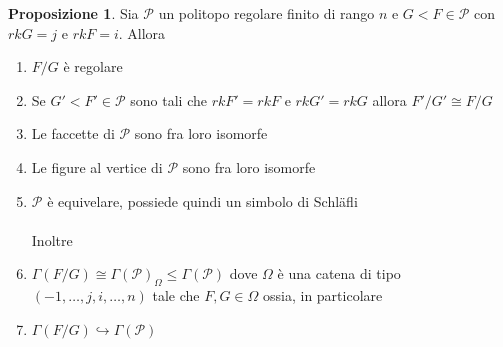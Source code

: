 \documentclass[a4paper,12pt]{report}
\newcommand{\p}{\mathcal{P}}
\theoremstyle{plain}
\theoremstyle{definition}
\newtheorem{prop}[teo]{Proposizione}
\newcommand\locallabel[1]{\label{\currentprefix_#1}}
\begin{document}
\def\currentprefix{prop:RegularSections}
\begin{prop}
\label{prop:RegularSections}
Sia $\p$ un politopo regolare finito di rango $n$ e $G<F\in\p$ con $rkG=j$ e $rkF=i$. Allora
\begin{enumerate}
\item\locallabel{1} $F/G$ \`e regolare
\item\locallabel{2} Se $G'<F'\in\p$ sono tali che $rkF'=rkF$ e $rkG'=rkG$ allora $F'/G'\cong F/G$
\item\locallabel{3} Le faccette di $\p$ sono fra loro isomorfe
\item\locallabel{4} Le figure al vertice di $\p$ sono fra loro isomorfe
\item\locallabel{5} $\p$ \`e equivelare, possiede quindi un simbolo di Schl\"afli\\\\
Inoltre
\item\locallabel{6} $\Gamma(F/G)\cong \Gamma(\p)_\Omega\leq\Gamma(\p)$ dove $\Omega$ \`e una catena di tipo $(-1,\dots,j,i,\dots,n)$ tale che $F,G\in\Omega$ ossia, in particolare
\item\locallabel{7} $\Gamma(F/G)\hookrightarrow\Gamma(\p)$
\end{enumerate}
\end{prop}
\end{document}
